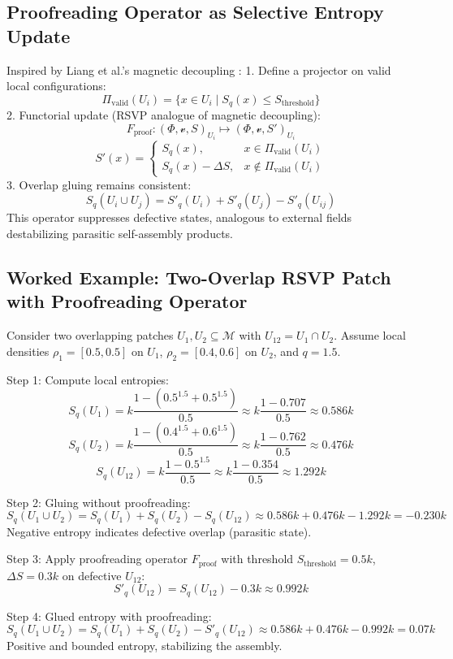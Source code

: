 \documentclass{article}
\begin{document}
\subsection{Proofreading Operator as Selective Entropy Update}
Inspired by Liang et al.’s magnetic decoupling \cite{Liang2025}:
1. Define a projector on valid local configurations:
\[
\Pi_\text{valid}(U_i) = \{ x \in U_i \mid S_q(x) \le S_\text{threshold} \}
\]
2. Functorial update (RSVP analogue of magnetic decoupling):
\[
F_\text{proof} : (\Phi, \mathcal{v}, S)_{U_i} \mapsto (\Phi, \mathcal{v}, S')_{U_i}
\]
\[
S'(x) = \begin{cases} S_q(x), & x \in \Pi_\text{valid}(U_i) \\ S_q(x) - \Delta S, & x \notin \Pi_\text{valid}(U_i) \end{cases}
\]
3. Overlap gluing remains consistent:
\[
S_q(U_i \cup U_j) = S'_q(U_i) + S'_q(U_j) - S'_q(U_{ij})
\]
This operator suppresses defective states, analogous to external fields destabilizing parasitic self-assembly products.

\subsection{Worked Example: Two-Overlap RSVP Patch with Proofreading Operator}
Consider two overlapping patches $U_1, U_2 \subseteq \mathcal{M}$ with $U_{12} = U_1 \cap U_2$. Assume local densities $\rho_1 = [0.5, 0.5]$ on $U_1$, $\rho_2 = [0.4, 0.6]$ on $U_2$, and $q = 1.5$.

Step 1: Compute local entropies:
\[
S_q(U_1) = k \frac{1 - (0.5^{1.5} + 0.5^{1.5})}{0.5} \approx k \frac{1 - 0.707}{0.5} \approx 0.586k
\]
\[
S_q(U_2) = k \frac{1 - (0.4^{1.5} + 0.6^{1.5})}{0.5} \approx k \frac{1 - 0.762}{0.5} \approx 0.476k
\]
\[
S_q(U_{12}) = k \frac{1 - 0.5^{1.5}}{0.5} \approx k \frac{1 - 0.354}{0.5} \approx 1.292k
\]

Step 2: Gluing without proofreading:
\[
S_q(U_1 \cup U_2) = S_q(U_1) + S_q(U_2) - S_q(U_{12}) \approx 0.586k + 0.476k - 1.292k = -0.230k
\]
Negative entropy indicates defective overlap (parasitic state).

Step 3: Apply proofreading operator $F_\text{proof}$ with threshold $S_\text{threshold} = 0.5k$, $\Delta S = 0.3k$ on defective $U_{12}$:
\[
S'_q(U_{12}) = S_q(U_{12}) - 0.3k \approx 0.992k
\]

Step 4: Glued entropy with proofreading:
\[
S_q(U_1 \cup U_2) = S_q(U_1) + S_q(U_2) - S'_q(U_{12}) \approx 0.586k + 0.476k - 0.992k = 0.07k
\]
Positive and bounded entropy, stabilizing the assembly.
\end{document}
